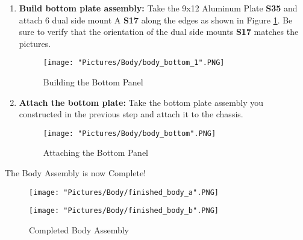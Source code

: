 \documentclass{article}
\begin{document}
\begin{enumerate}
\item \textbf{Build bottom plate assembly:} Take the 9x12 Aluminum Plate \textbf{S35} and attach 6 dual side mount A \textbf{S17} along the edges as shown in Figure \ref{build_bottom}. Be sure to verify that the orientation of the dual side mounts \textbf{S17} matches the pictures.

\begin{figure}[H]
	\centering
	\texttt{[image: "Pictures/Body/body\_bottom\_1".PNG]}
  \caption{Building the Bottom Panel}
  \label{build_bottom}
\end{figure}

\item \textbf{Attach the bottom plate:} Take the bottom plate assembly you constructed in the previous step and attach it to the chassis.

\begin{figure}[H]
	\centering
	\texttt{[image: "Pictures/Body/body\_bottom".PNG]}
	\caption{Attaching the Bottom Panel}
\end{figure}

\end{enumerate}

The Body Assembly is now Complete!

\begin{figure}[H]
  \centering
  \begin{minipage}[b]{0.45\textwidth}
    \texttt{[image: "Pictures/Body/finished\_body\_a".PNG]}
  \end{minipage}
  \hfill
  \begin{minipage}[b]{0.45\textwidth}
    \texttt{[image: "Pictures/Body/finished\_body\_b".PNG]}
  \end{minipage}
  \caption{Completed Body Assembly}
\end{figure}
\end{document}
